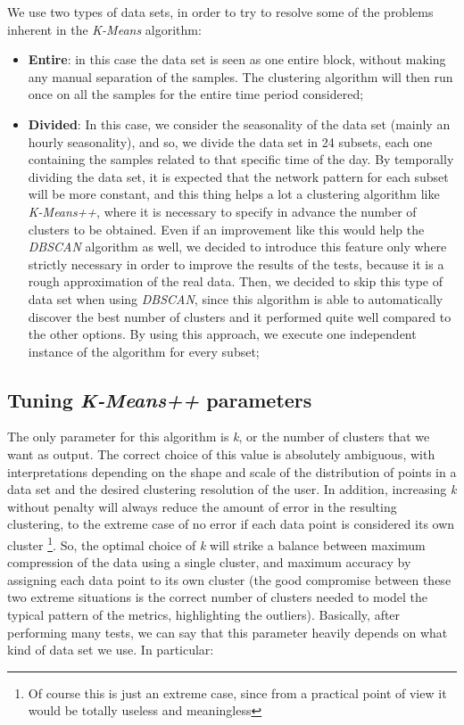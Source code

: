 \documentclass[12pt,a4paper,cucitura]{toptesi}
\begin{document}
We use two types of data sets, in order to try to resolve some of the problems inherent in the \emph{K-Means} algorithm:

\begin{itemize}
\item \textbf{Entire}: in this case the data set is seen as one entire block, without making any manual separation of the samples. The clustering algorithm will then run once on all the samples for the entire time period considered;
\item \textbf{Divided}: In this case, we consider the seasonality of the data set (mainly an hourly seasonality), and so, we divide the data set in 24 subsets, each one containing the samples related to that specific time of the day. By temporally dividing the data set, it is expected that the network pattern for each subset will be more constant, and this thing helps a lot a clustering algorithm like \emph{K-Means++}, where it is necessary to specify in advance the number of clusters to be obtained. Even if an improvement like this would help the \emph{DBSCAN} algorithm as well, we decided to introduce this feature only where strictly necessary in order to improve the results of the tests, because it is a rough approximation of the real data. Then, we decided to skip this type of data set when using \emph{DBSCAN}, since this algorithm is able to automatically discover the best number of clusters and it performed quite well compared to the other options. By using this approach, we execute one independent instance of the algorithm for every subset;
\end{itemize}

\subsection{Tuning \emph{K-Means++} parameters}

The only parameter for this algorithm is \emph{k}, or the number of clusters that we want as output.
The correct choice of this value is absolutely ambiguous, with interpretations depending on the shape and scale of the distribution of points in a data set and the desired clustering resolution of the user. In addition, increasing \emph{k} without penalty will always reduce the amount of error in the resulting clustering, to the extreme case of no error if each data point is considered its own cluster \footnote{Of course this is just an extreme case, since from a practical point of view it would be totally useless and meaningless}. So, the optimal choice of \emph{k} will strike a balance between maximum compression of the data using a single cluster, and maximum accuracy by assigning each data point to its own cluster (the good compromise between these two extreme situations is the correct number of clusters needed to model the typical pattern of the metrics, highlighting the outliers). Basically, after performing many tests, we can say that this parameter heavily depends on what kind of data set we use. In particular:
\end{document}
